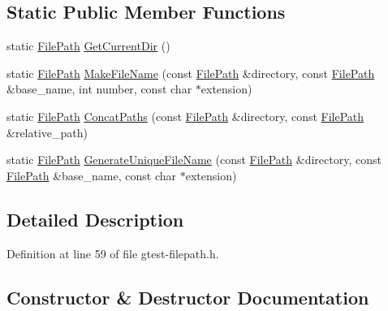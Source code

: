 \subsection*{Static Public Member Functions}
\begin{DoxyCompactItemize}
\item 
static \hyperlink{classtesting_1_1internal_1_1_file_path}{File\+Path} \hyperlink{classtesting_1_1internal_1_1_file_path_aaff39ccd7bfb7a1c09c0220a64326387}{Get\+Current\+Dir} ()
\item 
static \hyperlink{classtesting_1_1internal_1_1_file_path}{File\+Path} \hyperlink{classtesting_1_1internal_1_1_file_path_aa8c102da670261eb4fa8e2f2481df139}{Make\+File\+Name} (const \hyperlink{classtesting_1_1internal_1_1_file_path}{File\+Path} \&directory, const \hyperlink{classtesting_1_1internal_1_1_file_path}{File\+Path} \&base\+\_\+name, int number, const char $\ast$extension)
\item 
static \hyperlink{classtesting_1_1internal_1_1_file_path}{File\+Path} \hyperlink{classtesting_1_1internal_1_1_file_path_ac9d57987f60ac43f0c57b89e333e531e}{Concat\+Paths} (const \hyperlink{classtesting_1_1internal_1_1_file_path}{File\+Path} \&directory, const \hyperlink{classtesting_1_1internal_1_1_file_path}{File\+Path} \&relative\+\_\+path)
\item 
static \hyperlink{classtesting_1_1internal_1_1_file_path}{File\+Path} \hyperlink{classtesting_1_1internal_1_1_file_path_a2280a77adb394cf80bb5f73fc292e8c8}{Generate\+Unique\+File\+Name} (const \hyperlink{classtesting_1_1internal_1_1_file_path}{File\+Path} \&directory, const \hyperlink{classtesting_1_1internal_1_1_file_path}{File\+Path} \&base\+\_\+name, const char $\ast$extension)
\end{DoxyCompactItemize}


\subsection{Detailed Description}


Definition at line 59 of file gtest-\/filepath.\+h.



\subsection{Constructor \& Destructor Documentation}
